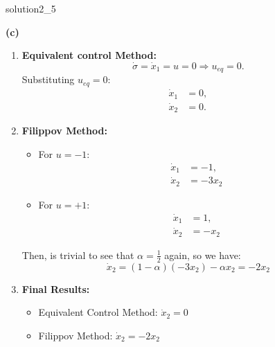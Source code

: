 \begin{solution}{}{solution2_5}
\begin{enumerate}
\begin{itemize}
		      \end{itemize}
	\end{enumerate}
	\textbf{(c)}
	\begin{enumerate}
		\item \textbf{Equivalent control Method:}
		      \[
			      \dot{\sigma} = \dot{x}_1 = u = 0 \Rightarrow u_{eq} = 0.
		      \]
		      Substituting $u_{eq} = 0$:
		      \begin{align*}
			      \dot{x}_1 & = 0, \\
			      \dot{x}_2 & = 0.
		      \end{align*}
		\item \textbf{Filippov Method:}
		      \begin{itemize}
			      \item For $u = -1$:
			            \begin{align*}
				            \dot{x}_1 & = -1,    \\
				            \dot{x}_2 & = -3 x_2
			            \end{align*}
			      \item For $u = +1$:
			            \begin{align*}
				            \dot{x}_1 & = 1,   \\
				            \dot{x}_2 & = -x_2
			            \end{align*}
		      \end{itemize}
		      Then, is trivial to see that $\alpha = \frac{1}{2}$ again, so we have:
		      \[
			      \dot{x}_2 = (1-\alpha)(-3x_2) - \alpha x_2 = -2x_2
		      \]
		\item \textbf{Final Results:}
		      \begin{itemize}
			      \item Equivalent Control Method: $\dot{x}_2 = 0$
			      \item Filippov Method: $\dot{x}_2 = -2x_2$
		      \end{itemize}
	\end{enumerate}


\end{solution}